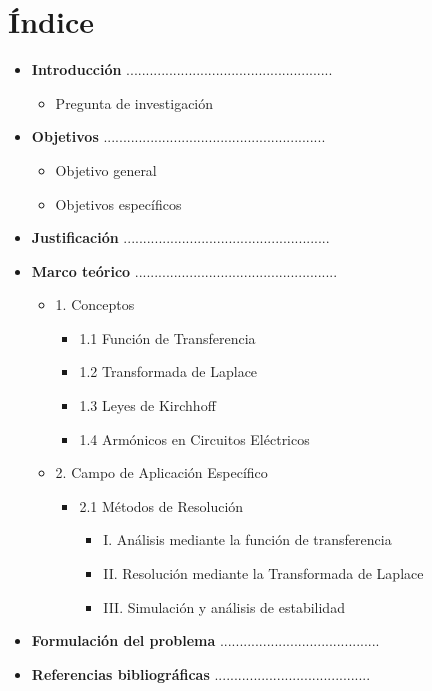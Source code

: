 \section*{\centering \textbf{Índice}}

\begin{itemize}
  \item \textbf{Introducción} ..................................................... \pageref{sec:introduccion}
  \begin{itemize}
    \item Pregunta de investigación
  \end{itemize}

  \item \textbf{Objetivos} ......................................................... \pageref{sec:objetivos}
  \begin{itemize}
    \item Objetivo general
    \item Objetivos específicos
  \end{itemize}

  \item \textbf{Justificación} ..................................................... \pageref{sec:justificacion}

  \item \textbf{Marco teórico} .................................................... \pageref{sec:marco_teorico}
  \begin{itemize}
    \item 1. Conceptos
    \begin{itemize}
      \item 1.1 Función de Transferencia
      \item 1.2 Transformada de Laplace
      \item 1.3 Leyes de Kirchhoff
      \item 1.4 Armónicos en Circuitos Eléctricos
    \end{itemize}
    \item 2. Campo de Aplicación Específico
    \begin{itemize}
      \item 2.1 Métodos de Resolución
      \begin{itemize}
        \item I. Análisis mediante la función de transferencia
        \item II. Resolución mediante la Transformada de Laplace
        \item III. Simulación y análisis de estabilidad
      \end{itemize}
    \end{itemize}
  \end{itemize}

  \item \textbf{Formulación del problema} ......................................... \pageref{sec:formulacion_problema}

  \item \textbf{Referencias bibliográficas} ........................................ \pageref{sec:referencias}
\end{itemize}

\newpage
